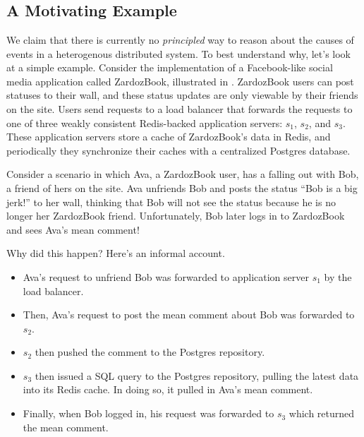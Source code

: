 \section{\WatProvenance{}}

\subsection{A Motivating Example}
\newcommand{\systemname}{ZardozBook} We claim that there is currently no
\emph{principled} way to reason about the causes of events in a heterogenous
distributed system. To best understand why, let's look at a simple example.
Consider the implementation of a Facebook-like social media application called
\systemname{}, illustrated in . \systemname{} users can
post statuses to their wall, and these status updates are only viewable by
their friends on the site. Users send requests to a load balancer that
forwards the requests to one of three weakly consistent Redis-backed
application servers: $s_1$, $s_2$, and $s_3$. These application servers store a
cache of \systemname{}'s data in Redis, and periodically they synchronize their
caches with a centralized Postgres database.

Consider a scenario in which Ava, a \systemname{} user, has a falling out with
Bob, a friend of hers on the site. Ava unfriends Bob and posts the status ``Bob
is a big jerk!'' to her wall, thinking that Bob will not see the status because
he is no longer her \systemname{} friend. Unfortunately, Bob later logs in to
\systemname{} and sees Ava's mean comment!

{}

Why did this happen? Here's an informal account.
\begin{itemize}
  \item
    Ava's request to unfriend Bob was forwarded to application server $s_1$ by
    the load balancer.
  \item
    Then, Ava's request to post the mean comment about Bob was forwarded to
    $s_2$.
  \item
    $s_2$ then pushed the comment to the Postgres repository.
  \item
    $s_3$ then issued a SQL query to the Postgres repository, pulling the
    latest data into its Redis cache. In doing so, it pulled in Ava's mean
    comment.
  \item
    Finally, when Bob logged in, his request was forwarded to $s_3$ which
    returned the mean comment.
\end{itemize}

